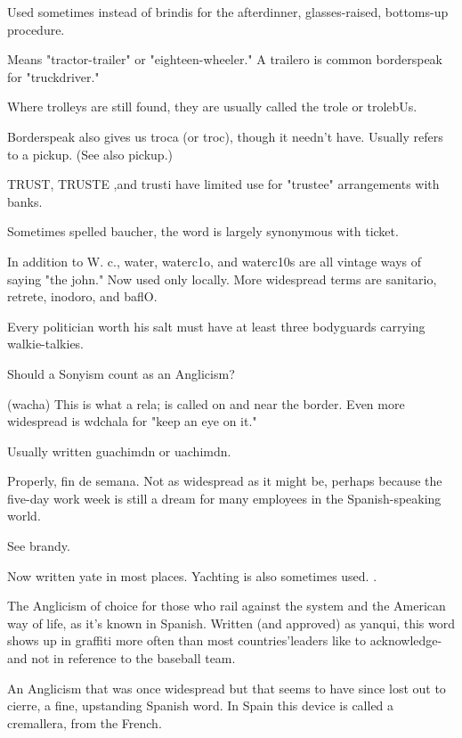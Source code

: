 Used sometimes instead of brindis for the afterdinner, glasses-raised, bottoms-up procedure.

 Means "tractor-trailer" or "eighteen-wheeler." A
trailero is common borderspeak for "truckdriver."

 Where trolleys are still found, they are usually
called the trole or trolebUs.

 Borderspeak also gives us troca (or troc), though it
needn't have. Usually refers to a pickup. (See also pickup.)

 TRUST, TRUSTE ,and trusti have limited use for
"trustee" arrangements with banks.

 Sometimes spelled baucher, the word is largely
synonymous with ticket.

 In addition to W. c., water, waterc1o, and waterc10s are
all vintage ways of saying "the john." Now used only locally. More
widespread terms are sanitario, retrete, inodoro, and baflO.

 Every politician worth his salt must have at
least three bodyguards carrying walkie-talkies.

 Should a Sonyism count as an Anglicism?

 (wacha) This is what a rela; is called on and near the
border. Even more widespread is wdchala for "keep an eye on it."

 Usually written guachimdn or uachimdn.

 Properly, fin de semana. Not as widespread as it
might be, perhaps because the five-day work week is still a dream for
many employees in the Spanish-speaking world.

 See brandy.

 Now written yate in most places. Yachting is also
sometimes used. .

 The Anglicism of choice for those who rail against
the system and the American way of life, as it's known in Spanish.
Written (and approved) as yanqui, this word shows up in graffiti more
often than most countries'leaders like to acknowledge-and not in
reference to the baseball team.

 An Anglicism that was once widespread but that
seems to have since lost out to cierre, a fine, upstanding Spanish
word. In Spain this device is called a cremallera, from the French.

